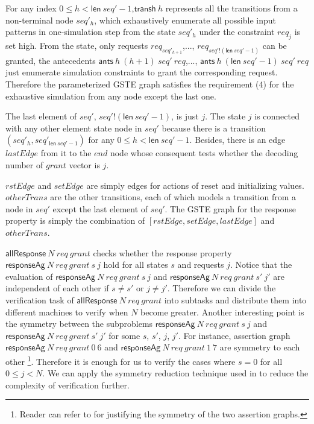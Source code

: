 \documentclass[final]{IEEEtran}
\begin{document}
For any index $0 \le h<  \mathsf{len}\ seq' -1$,$\mathsf{transh}\ h$
 represents all the transitions from a non-terminal node $seq'_h$,
 which
exhaustively enumerate all possible input patterns in one-simulation
step from the state $seq'_h$ under the constraint $req_j$ is set
high. From the state, only
 requests $req_{seq'_{h+1}}$,..., $req_{seq'!(\mathsf{len}\ seq'-1)}$ can be granted,
 the antecedents
$\mathsf{ants} \ h \ (h+1)\ seq'\ req$,..., $\mathsf{ants } \ h \
(\mathsf{len}\ seq' -1)\ seq'\ req$ just enumerate
 simulation constraints to grant the corresponding request. Therefore the parameterized GSTE graph satisfies the requirement
 (4) for  the exhaustive simulation from any  node except the last one.

 The last element of $seq'$, $seq'!(\mathsf{len}\ seq'-1)$, is just
 $j$. The state $j$ is connected with any other element state node in $seq'$ because there is
 a transition $(seq'_h,seq'_{\mathsf{len}\ seq'-1})$ for any $0\le h<\mathsf{len}\ seq'-1$.
 Besides,  there is an edge $lastEdge$ from it to the $end$ node whose
 consequent tests whether the decoding number of $grant$ vector is
$j$.

 $rstEdge$ and $setEdge$ are simply edges for actions of reset and
 initializing values. $otherTrans$ are the other transitions, each of which
 models a transition from a node in $seq'$ except the last element of $seq'$. The GSTE
 graph for the response property is simply the
 combination of  $[rstEdge,setEdge,lastEdge]$  and $otherTrans$.

 $\mathsf{allResponse} \     N\ req\ grant$ checks whether
  the response property $\mathsf{responseAg}\ N\ req\ grant\  s\ j$ hold
for all states $s$ and
 requests $j$. Notice that the evaluation of $\mathsf{responseAg}\ N\ req\ grant\  s\ j$
 and $\mathsf{responseAg}\ N\ req\  grant\  s'\ j'$ are independent of each other if $s
 \neq s'$ or $j \neq j'$. Therefore we can divide the verification
 task of  $\mathsf{allResponse} \     N\ req\ grant$ into subtasks and
 distribute them into different machines to verify when $N$ become
 greater. Another interesting point is the symmetry between the subproblems
 $\mathsf{responseAg}\ N\ req\  grant\  s\ j$ and  $\mathsf{responseAg}\ N\ req\  grant\  s'\ j'$
  for some $s$, $s'$, $j$, $j'$. For instance, assertion graph $\mathsf{responseAg}\ N\ req\  grant\  0\
  6$ and $\mathsf{responseAg}\ N\ req\  grant\  1\ 7$ are symmetry
  to each other \footnote{Reader can refer  to \cite{Li11ArbiterExperiments} for justifying
   the symmetry of the two assertion graphs.}.
  Therefore it is enough for us to verify the cases
  where $s=0$ for all $0 \le j <N$. We can apply the symmetry
  reduction technique used in \cite{springerlink:10.1007/s10703-011-0119-z,LiGsteSymmetry} to reduce the complexity of verification
  further.
\end{document}

